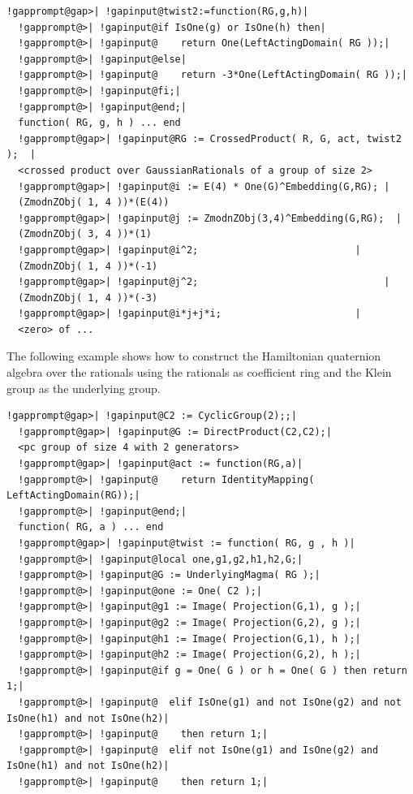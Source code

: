 \documentclass[a4paper,11pt]{report}
\begin{document}
{{{\begin{Verbatim}[commandchars=!@|,fontsize=\small,frame=single,label=Example]
  !gapprompt@gap>| !gapinput@twist2:=function(RG,g,h)|
  !gapprompt@>| !gapinput@if IsOne(g) or IsOne(h) then|
  !gapprompt@>| !gapinput@    return One(LeftActingDomain( RG ));|
  !gapprompt@>| !gapinput@else|
  !gapprompt@>| !gapinput@    return -3*One(LeftActingDomain( RG ));|
  !gapprompt@>| !gapinput@fi;|
  !gapprompt@>| !gapinput@end;|
  function( RG, g, h ) ... end
  !gapprompt@gap>| !gapinput@RG := CrossedProduct( R, G, act, twist2 );  |
  <crossed product over GaussianRationals of a group of size 2>
  !gapprompt@gap>| !gapinput@i := E(4) * One(G)^Embedding(G,RG); |
  (ZmodnZObj( 1, 4 ))*(E(4))
  !gapprompt@gap>| !gapinput@j := ZmodnZObj(3,4)^Embedding(G,RG);  |
  (ZmodnZObj( 3, 4 ))*(1)
  !gapprompt@gap>| !gapinput@i^2;                           |
  (ZmodnZObj( 1, 4 ))*(-1)
  !gapprompt@gap>| !gapinput@j^2;                                |
  (ZmodnZObj( 1, 4 ))*(-3)
  !gapprompt@gap>| !gapinput@i*j+j*i;                       |
  <zero> of ...
\end{Verbatim}
 The following example shows how to construct the Hamiltonian quaternion
algebra over the rationals using the rationals as coefficient ring and the
Klein group as the underlying group. 
\begin{Verbatim}[commandchars=!@|,fontsize=\small,frame=single,label=Example]
  !gapprompt@gap>| !gapinput@C2 := CyclicGroup(2);;|
  !gapprompt@gap>| !gapinput@G := DirectProduct(C2,C2);|
  <pc group of size 4 with 2 generators>
  !gapprompt@gap>| !gapinput@act := function(RG,a)|
  !gapprompt@>| !gapinput@    return IdentityMapping( LeftActingDomain(RG));|
  !gapprompt@>| !gapinput@end;|
  function( RG, a ) ... end
  !gapprompt@gap>| !gapinput@twist := function( RG, g , h )|
  !gapprompt@>| !gapinput@local one,g1,g2,h1,h2,G;|
  !gapprompt@>| !gapinput@G := UnderlyingMagma( RG );|
  !gapprompt@>| !gapinput@one := One( C2 );|
  !gapprompt@>| !gapinput@g1 := Image( Projection(G,1), g );|
  !gapprompt@>| !gapinput@g2 := Image( Projection(G,2), g );|
  !gapprompt@>| !gapinput@h1 := Image( Projection(G,1), h );|
  !gapprompt@>| !gapinput@h2 := Image( Projection(G,2), h );|
  !gapprompt@>| !gapinput@if g = One( G ) or h = One( G ) then return 1;|
  !gapprompt@>| !gapinput@  elif IsOne(g1) and not IsOne(g2) and not IsOne(h1) and not IsOne(h2)|
  !gapprompt@>| !gapinput@    then return 1;|
  !gapprompt@>| !gapinput@  elif not IsOne(g1) and IsOne(g2) and IsOne(h1) and not IsOne(h2)|
  !gapprompt@>| !gapinput@    then return 1;|

\end{Verbatim}}}}
\end{document}
